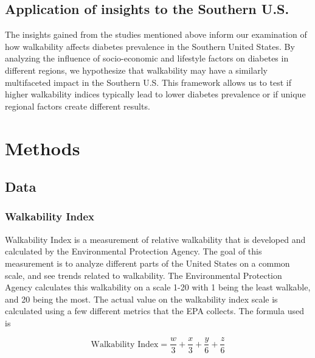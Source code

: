\documentclass[
]{article}
\begin{document}
\subsection{Application of insights to the Southern
U.S.}\label{application-of-insights-to-the-southern-u.s.}

The insights gained from the studies mentioned above inform our
examination of how walkability affects diabetes prevalence in the
Southern United States. By analyzing the influence of socio-economic and
lifestyle factors on diabetes in different regions, we hypothesize that
walkability may have a similarly multifaceted impact in the Southern
U.S. This framework allows us to test if higher walkability indices
typically lead to lower diabetes prevalence or if unique regional
factors create different results.

\section{Methods}\label{methods}

\subsection{Data}\label{data}

\subsubsection{Walkability Index}\label{walkability-index}

Walkability Index is a measurement of relative walkability that is
developed and calculated by the Environmental Protection Agency. The
goal of this measurement is to analyze different parts of the United
States on a common scale, and see trends related to walkability. The
Environmental Protection Agency calculates this walkability on a scale
1-20 with 1 being the least walkable, and 20 being the most. The actual
value on the walkability index scale is calculated using a few different
metrics that the EPA collects. The formula used is

\[\text{Walkability Index} = \frac{w}{3} + \frac{x}{3} +\frac{y}{6} + \frac{z}{6} \]
\end{document}
